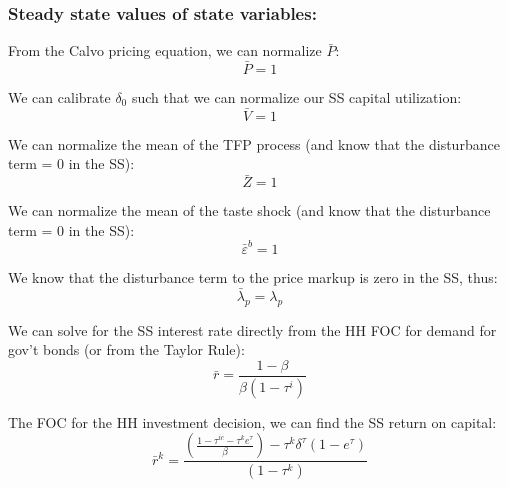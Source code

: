 \documentclass[article,11pt,letterpaper,fleqn]{article}
\theoremstyle{definition}
\numberwithin{equation}{section}
\begin{document}


\subsubsection{Steady state values of state variables:}

From the Calvo pricing equation, we can normalize $\bar{P}$:
\begin{equation}
\bar{P} = 1
\end{equation}

We can calibrate $\delta_{0}$ such that we can normalize our SS capital utilization:
\begin{equation}
\bar{V} = 1
\end{equation}

We can normalize the mean of the TFP process (and know that the disturbance term = 0 in the SS):
\begin{equation}
\bar{Z} = 1
\end{equation}

We can normalize the mean of the taste shock (and know that the disturbance term = 0 in the SS):
\begin{equation}
\bar{\varepsilon}^{b} = 1
\end{equation}

We know that the disturbance term to the price markup is zero in the SS, thus:
\begin{equation}
\bar{\lambda}_{p} = \lambda_{p}
\end{equation}

We can solve for the SS interest rate directly from the HH FOC for demand for gov't bonds (or from the Taylor Rule):
\begin{equation}
\bar{r} = \frac{1-\beta}{\beta(1-\tau^{i})}
\end{equation}

The FOC for the HH investment decision, we can find the SS return on capital:
\begin{equation}
\bar{r}^{k} = \frac{\left(\frac{1-\tau^{ic}-\tau^{k}e^{\tau}}{\beta}\right)-\tau^{k}\delta^{\tau}(1-e^{\tau})}{(1-\tau^{k})}
\end{equation}
\end{document}

